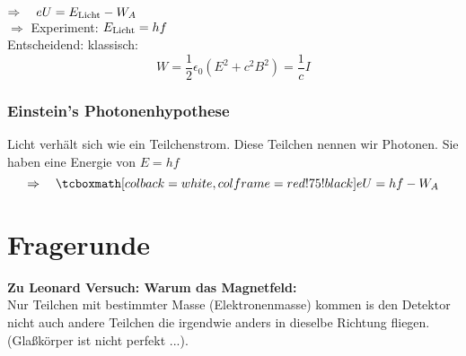 \\
$ \Rightarrow \quad e U = E_{\textrm{Licht}} - W_A $\\[5pt]
$ \Rightarrow $ Experiment: $ E_{\textrm{Licht}} = h f $\\[5pt]
Entscheidend: klassisch:
\begin{equation*}
W = \frac{1}{2} \epsilon_0 (E^2 + c^2 B^2) = \frac{1}{c} I
\end{equation*}

\subsubsection{Einstein's Photonenhypothese}

Licht verhält sich wie ein Teilchenstrom. Diese Teilchen nennen wir Photonen. Sie haben eine Energie von $ E = h f $
\begin{equation*}
\Rightarrow \quad \rmbox{e U = h f - W_A}
\end{equation*}

\section*{Fragerunde}

\textbf{Zu Leonard Versuch: Warum das Magnetfeld:}\\
Nur Teilchen mit bestimmter Masse (Elektronenmasse) kommen is den Detektor nicht auch andere Teilchen die irgendwie anders in dieselbe Richtung fliegen. (Glaßkörper ist nicht perfekt ...).\\[5pt]